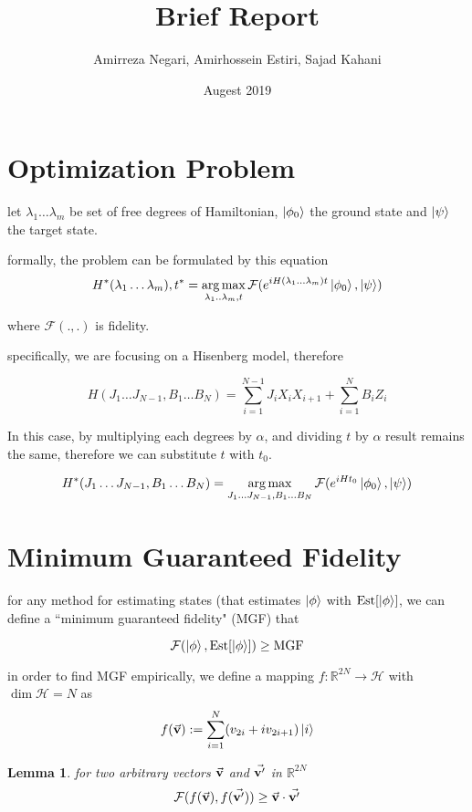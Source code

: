 \documentclass{article}
\title{Brief Report}
\author{Amirreza Negari, Amirhossein Estiri, Sajad Kahani}
\date{Augest 2019}
\DeclareMathOperator*{\argmax}{arg\,max}
\DeclareMathOperator*{\est}{Est}
\begin{document}
\maketitle

\section{Optimization Problem}
let ${\lambda_1\dots\lambda_m}$ be set of free degrees of Hamiltonian, $\ket{\phi_0}$ the ground state and $\ket{\psi}$ the target state.

formally, the problem can be formulated by this equation
\[ H^*(\lambda_1\dots\lambda_m), t^* = \argmax_{\lambda_1..\lambda_m, t} \mathcal{F}(e^{iH(\lambda_1\dots\lambda_m)t} \ket{\phi_0}, \ket{\psi}) \]

where $\mathcal{F}(., .)$ is fidelity.

specifically, we are focusing on a Hisenberg model, therefore

\[ H(J_1\dots J_{N-1}, B_1\dots B_N) = \sum_{i=1}^{N-1} J_i X_i X_{i+1} + \sum_{i=1}^N B_i Z_i\]

In this case, by multiplying each degrees by $\alpha$, and dividing $t$ by $\alpha$ result remains the same, therefore we can substitute $t$ with $t_0$.

\begin{equation} 
\label{eq:opt}
H^*(J_1\dots J_{N-1}, B_1\dots B_N) = \argmax_{J_1\dots J_{N-1}, B_1\dots B_N} \mathcal{F}(e^{iHt_0} \ket{\phi_0}, \ket{\psi})
\end{equation}


\section{Minimum Guaranteed Fidelity}

for any method for estimating states (that estimates $\ket{\phi}$ with $\est[\ket{\phi}]$, we can define a ``minimum guaranteed fidelity" (MGF) that

\[ \mathcal{F}(\ket{\phi}, \est[\ket{\phi}]) \ge \text{MGF} \]

in order to find MGF empirically, 
we define a mapping $f: \mathbb{R}^{2N} \rightarrow \mathcal{H}$ with $\dim \mathcal{H} = N$ as 
\[ f(\va{v}) := \sum_{i=1}^N (v_{2i} + iv_{2i+1}) \ket{i}\]

\newtheorem{lemma}{Lemma}
\begin{lemma}
for two arbitrary vectors $\va{v}$ and $\va{v'}$ in $\mathbb{R}^{2N}$
\[ \mathcal{F}(f(\va{v}), f(\va{v'})) \ge \va{v}\cdot\va{v'} \]
\end{lemma}
\end{document}
